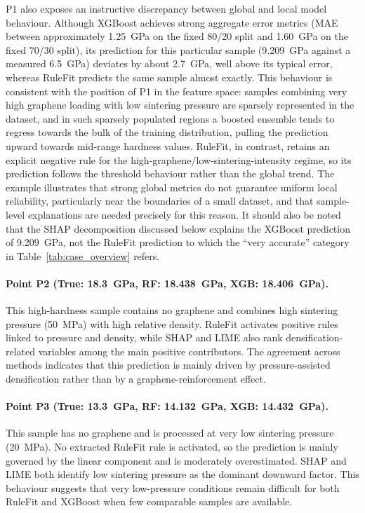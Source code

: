 \documentclass[pdflatex,sn-mathphys-num]{sn-jnl}%
\theoremstyle{thmstyleone}%
\theoremstyle{thmstyletwo}%
\theoremstyle{thmstylethree}%
\begin{document}
P1 also exposes an instructive discrepancy between global and local model behaviour. Although XGBoost achieves strong aggregate error metrics (MAE between approximately 1.25~GPa on the fixed 80/20 split and 1.60~GPa on the fixed 70/30 split), its prediction for this particular sample (9.209~GPa against a measured 6.5~GPa) deviates by about 2.7~GPa, well above its typical error, whereas RuleFit predicts the same sample almost exactly. This behaviour is consistent with the position of P1 in the feature space: samples combining very high graphene loading with low sintering pressure are sparsely represented in the dataset, and in such sparsely populated regions a boosted ensemble tends to regress towards the bulk of the training distribution, pulling the prediction upward towards mid-range hardness values. RuleFit, in contrast, retains an explicit negative rule for the high-graphene/low-sintering-intensity regime, so its prediction follows the threshold behaviour rather than the global trend. The example illustrates that strong global metrics do not guarantee uniform local reliability, particularly near the boundaries of a small dataset, and that sample-level explanations are needed precisely for this reason. It should also be noted that the SHAP decomposition discussed below explains the XGBoost prediction of 9.209~GPa, not the RuleFit prediction to which the ``very accurate'' category in Table~\ref{tab:case_overview} refers.

\paragraph{Point P2 (True: 18.3~GPa, RF: 18.438~GPa, XGB: 18.406~GPa).}
This high-hardness sample contains no graphene and combines high sintering pressure (50~MPa) with high relative density. RuleFit activates positive rules linked to pressure and density, while SHAP and LIME also rank densification-related variables among the main positive contributors. The agreement across methods indicates that this prediction is mainly driven by pressure-assisted densification rather than by a graphene-reinforcement effect.

\paragraph{Point P3 (True: 13.3~GPa, RF: 14.132~GPa, XGB: 14.432~GPa).}
This sample has no graphene and is processed at very low sintering pressure (20~MPa). No extracted RuleFit rule is activated, so the prediction is mainly governed by the linear component and is moderately overestimated. SHAP and LIME both identify low sintering pressure as the dominant downward factor. This behaviour suggests that very low-pressure conditions remain difficult for both RuleFit and XGBoost when few comparable samples are available.
\end{document}
